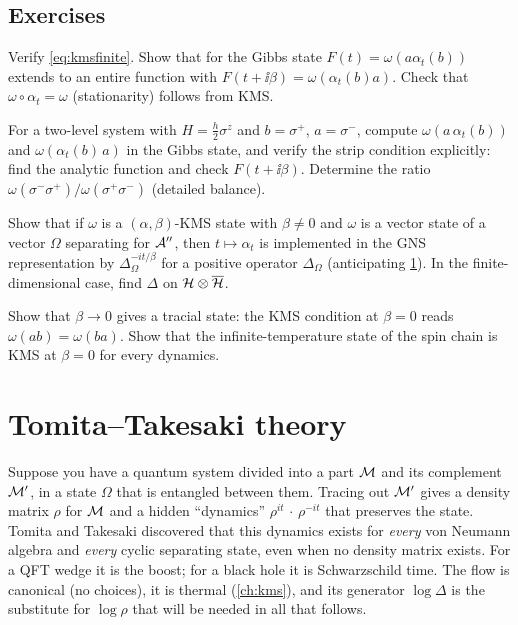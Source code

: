 \subsection*{Exercises}
\begin{exercise}\label{ex:kms:1}
Verify \eqref{eq:kmsfinite}. Show that for the Gibbs state $F(t)=\omega(a\alpha_t(b))$ extends to an entire function with $F(t+\ii\beta)=\omega(\alpha_t(b)a)$. Check that $\omega\circ\alpha_t=\omega$ (stationarity) follows from KMS.
\end{exercise}
\begin{exercise}\label{ex:kms:2}
For a two-level system with $H=\frac h2\sigma^z$ and $b=\sigma^+$, $a=\sigma^-$, compute $\omega(a\,\alpha_t(b))$ and $\omega(\alpha_t(b)\,a)$ in the Gibbs state, and verify the strip condition explicitly: find the analytic function and check $F(t+\ii\beta)$. Determine the ratio $\omega(\sigma^-\sigma^+)/\omega(\sigma^+\sigma^-)$ (detailed balance).
\end{exercise}
\begin{exercise}\label{ex:kms:3}
Show that if $\omega$ is a $(\alpha,\beta)$-KMS state with $\beta\ne0$ and $\omega$ is a vector state of a vector $\Omega$ separating for $\mathcal{A}''$, then $t\mapsto\alpha_t$ is implemented in the GNS representation by $\Delta_\Omega^{-it/\beta}$ for a positive operator $\Delta_\Omega$ (anticipating \cref{ch:tomita}). In the finite-dimensional case, find $\Delta$ on $\mathcal{H}\otimes\overline{\mathcal{H}}$.
\end{exercise}
\begin{exercise}\label{ex:kms:4}
Show that $\beta\to0$ gives a tracial state: the KMS condition at $\beta=0$ reads $\omega(ab)=\omega(ba)$. Show that the infinite-temperature state of the spin chain is KMS at $\beta=0$ for every dynamics.
\end{exercise}

\section{Tomita--Takesaki theory}\label{ch:tomita}

\begin{physmotiv}
Suppose you have a quantum system divided into a part $\mathcal{M}$ and its complement $\mathcal{M}'$, in a state $\Omega$ that is entangled between them. Tracing out $\mathcal{M}'$ gives a density matrix $\rho$ for $\mathcal{M}$ and a hidden ``dynamics'' $\rho^{it}\,\cdot\,\rho^{-it}$ that preserves the state. Tomita and Takesaki discovered that this dynamics exists for \emph{every} von Neumann algebra and \emph{every} cyclic separating state, even when no density matrix exists. For a QFT wedge it is the boost; for a black hole it is Schwarzschild time. The flow is canonical (no choices), it is thermal (\cref{ch:kms}), and its generator $\log\Delta$ is the substitute for $\log\rho$ that will be needed in all that follows.
\end{physmotiv}

